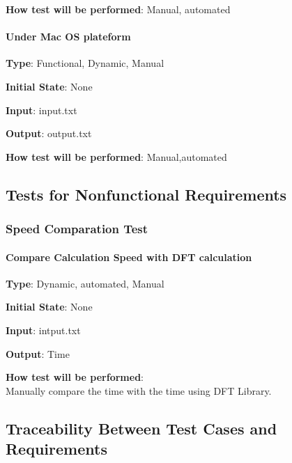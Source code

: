 \documentclass[12pt, titlepage]{article}
\begin{document}
\textbf {How test will be performed}: Manual, automated


\paragraph{Under Mac OS plateform\\}

\textbf {Type}: Functional, Dynamic, Manual
					
\textbf {Initial State}: None
					
\textbf {Input}: input.txt
					
\textbf {Output}: output.txt
					
\textbf {How test will be performed}: Manual,automated



\subsection{Tests for Nonfunctional Requirements}

\subsubsection{Speed Comparation Test}
		
\paragraph{Compare Calculation Speed with DFT calculation\\}

\textbf {Type}: Dynamic, automated, Manual
					
\textbf {Initial State}: None
					
\textbf {Input}: intput.txt
					
\textbf {Output}: Time
					
\textbf {How test will be performed}: \\
Manually compare the time with the time using DFT Library.


\subsection{Traceability Between Test Cases and Requirements}

\end{document}
